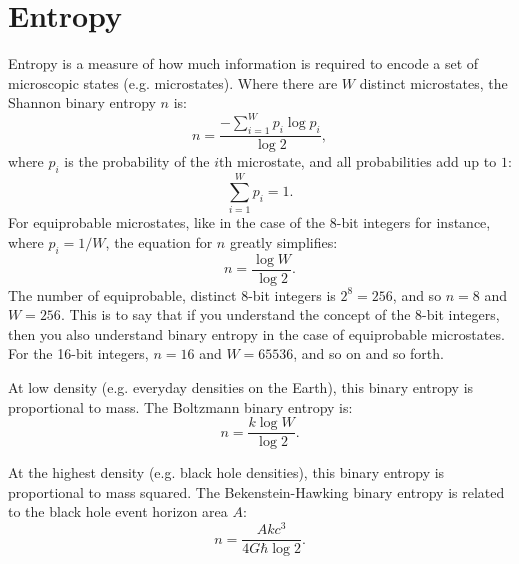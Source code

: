 \documentclass[12pt]{article}
\begin{document}
\section{Entropy}
Entropy is a measure of how much information is required to encode a set of microscopic states (e.g. microstates).
Where there are $W$ distinct microstates, the Shannon binary entropy $n$ is:
\begin{equation}
n =  \frac{-\sum_{i = 1}^{W} p_i \log p_i} {\log 2},
\end{equation}
where $p_i$ is the probability of the $i$th microstate, and all probabilities add up to $1$:
\begin{equation}
\sum_{i = 1}^{W} p_i = 1.
\end{equation}
For equiprobable microstates, like in the case of the 8-bit integers for instance, where $p_i = 1/W$, the equation for $n$ greatly simplifies:
\begin{equation}
n = \frac{\log W}{\log 2}.
\end{equation}
The number of equiprobable, distinct 8-bit integers is $2^8 = 256$, and so $n = 8$ and $W= 256$.
This is to say that if you understand the concept of the 8-bit integers, then you also understand binary entropy in the case of equiprobable microstates.
For the 16-bit integers, $n = 16$ and $W = 65536$, and so on and so forth.

At low density (e.g. everyday densities on the Earth), this binary entropy is proportional to mass.
The Boltzmann binary entropy is:
\begin{equation}
n = \frac{k \log W}{\log 2}.
\end{equation}

At the highest density (e.g. black hole densities), this binary entropy is proportional to mass squared.
The Bekenstein-Hawking binary entropy is related to the black hole event horizon area $A$:
\begin{equation}
n = \frac{A k c^3}{ 4 G \hbar \log 2}.
\end{equation}
\end{document}
